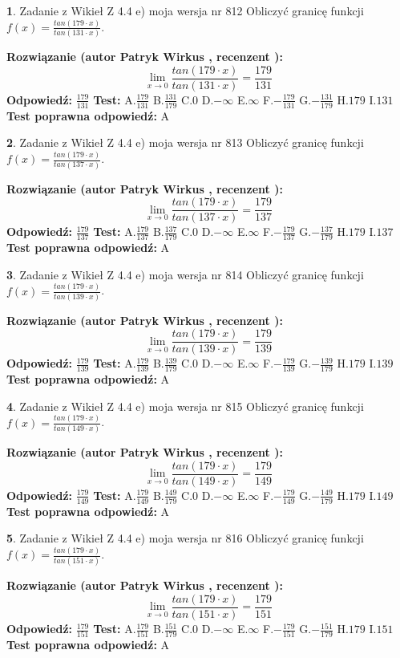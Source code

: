 \documentclass[12pt, a4paper]{article}
\theoremstyle{definition} %
\newtheorem{zad}{}
\newcommand{\zadStart}[1]{\begin{zad}#1\newline}
\newcommand{\zadStop}{\end{zad}}
\newcommand{\rozwStart}[2]{\noindent \textbf{Rozwiązanie (autor #1 , recenzent #2): }\newline}
\newcommand{\rozwStop}{\newline}
\newcommand{\odpStart}{\noindent \textbf{Odpowiedź:}\newline}
\newcommand{\odpStop}{\newline}
\newcommand{\testStart}{\noindent \textbf{Test:}\newline}
\newcommand{\testStop}{\newline}
\newcommand{\kluczStart}{\noindent \textbf{Test poprawna odpowiedź:}\newline}
\newcommand{\kluczStop}{\newline}
\begin{document}
\zadStart{Zadanie z Wikieł Z 4.4 e) moja wersja nr 812}
Obliczyć granicę funkcji $f(x)=\frac{tan(179\cdot x)}{tan(131\cdot x)}$.
\zadStop
\rozwStart{Patryk Wirkus}{}
$$\lim\limits_{x\to 0}\frac{tan(179\cdot x)}{tan(131\cdot x)}=
\frac{179}{131}$$
\rozwStop
\odpStart
$\frac{179}{131}$
\odpStop
\testStart
A.$\frac{179}{131}$
B.$\frac{131}{179}$
C.$0$
D.$-\infty$
E.$\infty$
F.$-\frac{179}{131}$
G.$-\frac{131}{179}$
H.$179$
I.$131$
\testStop
\kluczStart
A
\kluczStop



\zadStart{Zadanie z Wikieł Z 4.4 e) moja wersja nr 813}
Obliczyć granicę funkcji $f(x)=\frac{tan(179\cdot x)}{tan(137\cdot x)}$.
\zadStop
\rozwStart{Patryk Wirkus}{}
$$\lim\limits_{x\to 0}\frac{tan(179\cdot x)}{tan(137\cdot x)}=
\frac{179}{137}$$
\rozwStop
\odpStart
$\frac{179}{137}$
\odpStop
\testStart
A.$\frac{179}{137}$
B.$\frac{137}{179}$
C.$0$
D.$-\infty$
E.$\infty$
F.$-\frac{179}{137}$
G.$-\frac{137}{179}$
H.$179$
I.$137$
\testStop
\kluczStart
A
\kluczStop



\zadStart{Zadanie z Wikieł Z 4.4 e) moja wersja nr 814}
Obliczyć granicę funkcji $f(x)=\frac{tan(179\cdot x)}{tan(139\cdot x)}$.
\zadStop
\rozwStart{Patryk Wirkus}{}
$$\lim\limits_{x\to 0}\frac{tan(179\cdot x)}{tan(139\cdot x)}=
\frac{179}{139}$$
\rozwStop
\odpStart
$\frac{179}{139}$
\odpStop
\testStart
A.$\frac{179}{139}$
B.$\frac{139}{179}$
C.$0$
D.$-\infty$
E.$\infty$
F.$-\frac{179}{139}$
G.$-\frac{139}{179}$
H.$179$
I.$139$
\testStop
\kluczStart
A
\kluczStop



\zadStart{Zadanie z Wikieł Z 4.4 e) moja wersja nr 815}
Obliczyć granicę funkcji $f(x)=\frac{tan(179\cdot x)}{tan(149\cdot x)}$.
\zadStop
\rozwStart{Patryk Wirkus}{}
$$\lim\limits_{x\to 0}\frac{tan(179\cdot x)}{tan(149\cdot x)}=
\frac{179}{149}$$
\rozwStop
\odpStart
$\frac{179}{149}$
\odpStop
\testStart
A.$\frac{179}{149}$
B.$\frac{149}{179}$
C.$0$
D.$-\infty$
E.$\infty$
F.$-\frac{179}{149}$
G.$-\frac{149}{179}$
H.$179$
I.$149$
\testStop
\kluczStart
A
\kluczStop



\zadStart{Zadanie z Wikieł Z 4.4 e) moja wersja nr 816}
Obliczyć granicę funkcji $f(x)=\frac{tan(179\cdot x)}{tan(151\cdot x)}$.
\zadStop
\rozwStart{Patryk Wirkus}{}
$$\lim\limits_{x\to 0}\frac{tan(179\cdot x)}{tan(151\cdot x)}=
\frac{179}{151}$$
\rozwStop
\odpStart
$\frac{179}{151}$
\odpStop
\testStart
A.$\frac{179}{151}$
B.$\frac{151}{179}$
C.$0$
D.$-\infty$
E.$\infty$
F.$-\frac{179}{151}$
G.$-\frac{151}{179}$
H.$179$
I.$151$
\testStop
\kluczStart
A
\kluczStop
\end{document}
